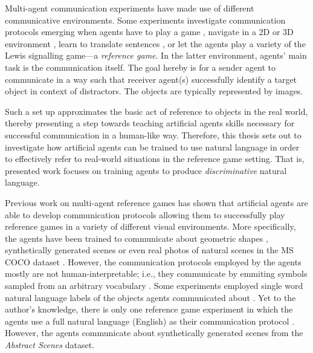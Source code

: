 Multi-agent communication experiments have made use of different communicative environments. Some experiments investigate communication protocols emerging when agents have to play a game , navigate in a 2D or 3D environment \parencite{das2019tarmac, jaques2019social}, learn to translate sentences \parencite{lee2019countering}, or let the agents play a variety of the Lewis signalling game---a \textit{reference game}. In the latter environment, agents' main task is the communication itself. The goal hereby is for a sender agent to communicate in a way such that receiver agent(s) successfully identify a target object in context of distractors. The objects are typically represented by images. 

Such a set up approximates the basic act of reference to objects in the real world, thereby presenting a step towards teaching artificial agents skills necessary for successful communication in a human-like way.
Therefore, this thesis sets out to investigate how artificial agents can be trained to use natural language in order to effectively refer to real-world situations in the reference game setting. That is, presented work focuses on training agents to produce \textit{discriminative} natural language. 

Previous work on multi-agent reference games has shown that artificial agents are able to develop communication protocols allowing them to successfully play reference games in a variety of different visual environments. More specifically, the agents have been trained to communicate about geometric shapes , synthetically generated scenes \parencite{lazaridou2020multi} or even real photos of natural scenes in the MS COCO dataset \parencite{lazaridou2016multi, lin2014microsoft, havrylov2017emergence}. However, the communication protocols employed by the agents mostly are not human-interpretable; i.e., they communicate by emmiting symbols sampled from an arbitrary vocabulary \parencite{foerster2016learning}.  Some experiments employed single word natural language labels of the objects agents communicated about \parencite{lazaridou2016multi}. Yet to the author's knowledge, there is only one reference game experiment in which the agents use a full natural language (English) as their communication protocol \parencite{lazaridou2020multi} . However, the agents communicate about synthetically generated scenes from the \textit{Abstract Scenes} dataset. 

